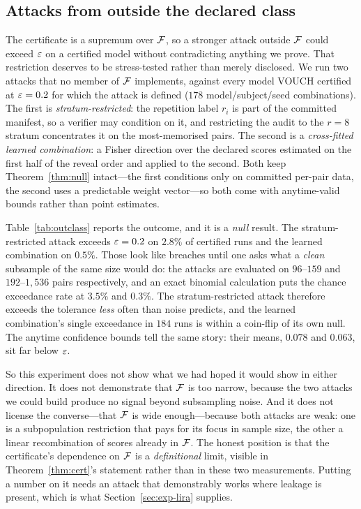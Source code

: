 \subsection{Attacks from outside the declared class}\label{sec:exp-outclass}

The certificate is a supremum over $\mathcal{F}$, so a stronger attack outside $\mathcal{F}$ could exceed
$\varepsilon$ on a certified model without contradicting anything we prove. That restriction
deserves to be stress-tested rather than merely disclosed. We run two attacks that no
member of $\mathcal{F}$ implements, against every model VOUCH certified at $\varepsilon = 0.2$ for which the
attack is defined ($178$ model/subject/seed combinations). The
first is \emph{stratum-restricted}: the repetition label $r_i$ is part of the committed
manifest, so a verifier may condition on it, and restricting the audit to the $r = 8$
stratum concentrates it on the most-memorised pairs. The second is a
\emph{cross-fitted learned combination}: a Fisher direction over the declared scores
estimated on the first half of the reveal order and applied to the second. Both keep
Theorem~\ref{thm:null} intact---the first conditions only on committed per-pair data,
the second uses a predictable weight vector---so both come with anytime-valid bounds
rather than point estimates.

Table~\ref{tab:outclass} reports the outcome, and it is a \emph{null} result. The stratum-restricted attack exceeds
$\varepsilon = 0.2$ on $2.8\%$ of certified runs and the learned combination on $0.5\%$. Those
look like breaches until one asks what a \emph{clean} subsample of the same size would
do: the attacks are evaluated on $96$--$159$ and $192$--$1{,}536$ pairs respectively, and
an exact binomial calculation puts the chance exceedance rate at $3.5\%$ and $0.3\%$. The
stratum-restricted attack therefore exceeds the tolerance \emph{less} often than noise
predicts, and the learned combination's single exceedance in $184$ runs is within a
coin-flip of its own null. The anytime confidence bounds tell the same story: their
means, $0.078$ and $0.063$, sit far below $\varepsilon$.

So this experiment does not show what we had hoped it would show in either direction.
It does not demonstrate that $\mathcal{F}$ is too narrow, because the two attacks we could
build produce no signal beyond subsampling noise. And it does not license the
converse---that $\mathcal{F}$ is wide enough---because both attacks are weak: one is a
subpopulation restriction that pays for its focus in sample size, the other a linear
recombination of scores already in $\mathcal{F}$. The honest position is that the certificate's
dependence on $\mathcal{F}$ is a \emph{definitional} limit, visible in
Theorem~\ref{thm:cert}'s statement rather than in these two measurements. Putting a
number on it needs an attack that demonstrably works where leakage is present, which
is what Section~\ref{sec:exp-lira} supplies.

